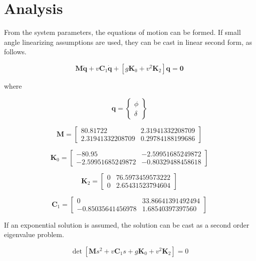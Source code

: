 \section*{Analysis}
From the system parameters, the equations of motion can be formed.  If small angle linearizing assumptions are used, they can be cast in linear second form, as follows.

\begin{equation}
{\mathbf M}\ddot{\bm q} + v{\mathbf C}_1\dot{\bm q} + [g{\mathbf K}_0 + v^2{\mathbf K_2}]{\bm q}={\mathbf 0}
\end{equation}

where

\begin{equation}
{\bm q}=\begin{Bmatrix}
\phi\\\delta
\end{Bmatrix}
\end{equation}


\begin{equation}
{\mathbf M}=
\begin{bmatrix}
80.81722 & 2.31941332208709\\
2.31941332208709 & 0.29784188199686
\end{bmatrix}
\end{equation}

\begin{equation}
{\mathbf K}_0=
\begin{bmatrix}
-80.95 & -2.59951685249872\\
-2.59951685249872 & -0.80329488458618
\end{bmatrix}
\end{equation}

\begin{equation}
{\mathbf K_2}=
\begin{bmatrix}
0 & 76.5973459573222\\
0 & 2.65431523794604
\end{bmatrix}
\end{equation}

\begin{equation}
{\mathbf C_1}=
\begin{bmatrix}
0 & 33.86641391492494\\
-0.85035641456978 & 1.68540397397560
\end{bmatrix}
\end{equation}

If an exponential solution is assumed, the solution can be cast as a second order eigenvalue problem.

\begin{equation}
\det [{\mathbf M}s^2 + v{\mathbf C}_1s + g{\mathbf K}_0 + v^2{\mathbf K_2}]=0
\end{equation}

